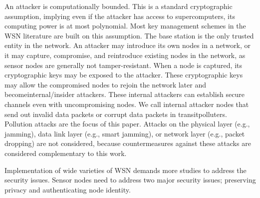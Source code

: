 \documentclass[conference,man]{IEEEtran}
\begin{document}
An attacker is computationally bounded. This is a standard
cryptographic assumption, implying even if the attacker has
access to supercomputers, its computing power is at most
polynomial. Most key management schemes in the WSN
literature are built on this assumption.
The base station is the only trusted entity in the network.
An attacker may introduce its own nodes in a network,
or it may capture, compromise, and reintroduce existing
nodes in the network, as sensor nodes are generally not
tamper-resistant. When a node is captured, its cryptographic
keys may be exposed to the attacker. These cryptographic
keys may allow the compromised nodes to rejoin the
network later and becomeinternal/insider attackers. These
internal attackers can establish secure channels even with
uncompromising nodes. We call internal attacker nodes that
send out invalid data packets or corrupt data packets in
transitpolluters.
Pollution attacks are the focus of this paper. Attacks on
the physical layer (e.g., jamming), data link layer (e.g., smart
jamming), or network layer (e.g., packet dropping) are not
considered, because countermeasures against these attacks
are considered complementary to this work.





Implementation of wide varieties of WSN  demands more studies to address the security issues. Sensor nodes need to address two major security issues; preserving privacy and authenticating node identity.\\
\end{document}
